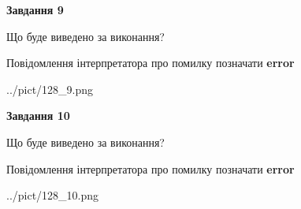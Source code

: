 \documentclass[12pt, ukrainian]{article}
\begin{document}
{{\begin {center}\textbf{Завдання 9}\end {center}}\par
Що буде виведено за виконання? \par
Повідомлення інтерпретатора про помилку позначати \textbf{error}

\begin{center}
	{../pict/128_9.png}
\end{center}
\newpage

{\begin {center}\textbf{Завдання 10}\end {center}}\par
Що буде виведено за виконання? \par
Повідомлення інтерпретатора про помилку позначати \textbf{error}

\begin{center}
	{../pict/128_10.png}
\end{center}
\newpage

}
\end{document}
